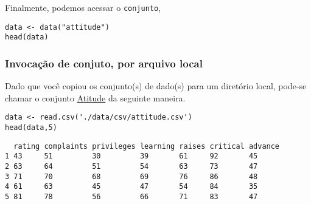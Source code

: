 \documentclass[11pt]{article}
\begin{document}
Finalmente, podemos acessar o \texttt{conjunto},
\begin{verbatim}
data <- data("attitude")
head(data)
\end{verbatim}
\subsubsection{Invocação de conjuto, por arquivo local}
\label{sec:orgbdd9a2e}

Dado que você copiou os conjunto(s) de dado(s) para um diretório
local, pode-se chamar o conjunto \href{https://drive.google.com/file/d/1rKj4NPD61bWKD6HBC4fux2Eit6CNEKwr/view?usp=sharing}{Atitude} da seguinte maneira.

\begin{verbatim}
data <- read.csv('./data/csv/attitude.csv')
head(data,5)
\end{verbatim}

\begin{verbatim}
  rating complaints privileges learning raises critical advance
1 43     51         30         39       61     92       45     
2 63     64         51         54       63     73       47     
3 71     70         68         69       76     86       48     
4 61     63         45         47       54     84       35     
5 81     78         56         66       71     83       47     
\end{verbatim}
\end{document}
